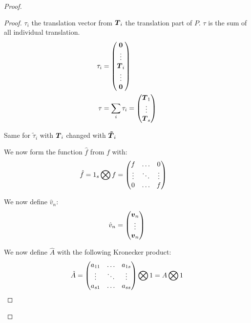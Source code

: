 \begin{proof}
\begin{proof}
$\tau_{i}$ the translation vector from ${\boldsymbol {T}}_i$ the translation part of $P$.
$\tau$ is the sum of all individual translation.
\begin{align}
	\tau_i&=\begin{pmatrix}
			{\boldsymbol {0}}\\
			\vdots\\
			{\boldsymbol {T}}_{i}\\
			\vdots\\
			{\boldsymbol {0}}\\
	\end{pmatrix}
	\\
	\tau&=\sum_{i}\tau_{i}=\begin{pmatrix}
			{\boldsymbol {T}}_{1}\\
			\vdots\\
			{\boldsymbol {T}}_{s}\\
	\end{pmatrix}
\end{align}

Same for $\tilde{\tau}_{i}$ with ${\boldsymbol {T}}_{i}$ changed with ${\boldsymbol {\tilde{T}}}_i$

We now form the function $\hat{f}$ from $f$ with:
\begin{align}
\hat{f}&=1_{s}\bigotimes f=\begin{pmatrix}f	&\ldots	&0\\
			\vdots &\ddots 	&\vdots\\
			0	&\ldots	&f\\
	\end{pmatrix}
\end{align}

We now define $\hat{v}_n$:
\begin{equation}
\hat{v}_{n}=\begin{pmatrix}
	      {\boldsymbol {v}}_{n}\\
	      \vdots\\
	      {\boldsymbol {v}}_{n}
	      \end{pmatrix}
\end{equation}

We now define $\hat{A}$ with the following Kronecker product:
\begin{equation}
\hat{A}=\begin{pmatrix}
    a_{11}	&\ldots	&a_{1s}\\
    \vdots	&\ddots	&\vdots\\
    a_{s1}	&\ldots	&a_{ss}\\
  \end{pmatrix} \bigotimes 1=A \bigotimes 1
\end{equation}


\end{proof}
\end{proof}
